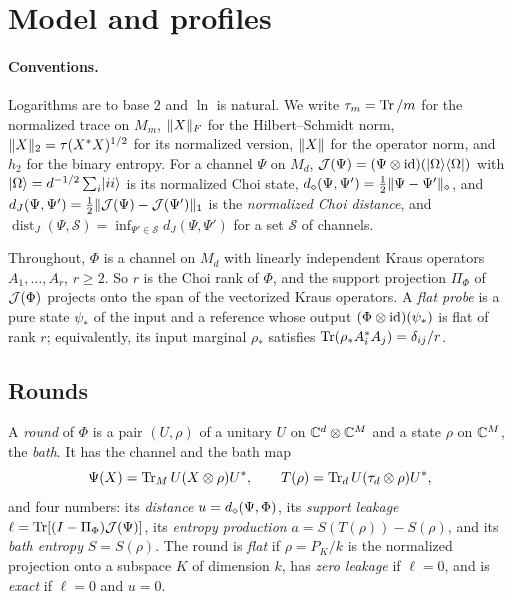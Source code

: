 \section{Model and profiles}\label{sec:model}

\paragraph{Conventions.} Logarithms are to base $2$ and $\ln$ is natural. We write $\tau_m=\operatorname{Tr}/m$ for the normalized trace on $M_m$,
$\lVert X\rVert_F$ for the Hilbert--Schmidt norm, $\lVert X\rVert_2=\tau(X^*X)^{1/2}$ for its normalized version, $\lVert X\rVert$ for the operator norm, and
$h_2$ for the binary entropy. For a channel $\Psi$ on $M_d$, $\mathcal J(\Psi)=(\Psi\otimes\mathrm{id})(\lvert \Omega\rangle\langle \Omega\rvert)$ with
$\lvert \Omega\rangle=d^{-1/2}\sum_i\lvert ii\rangle$ is its normalized Choi state, $d_\diamond(\Psi,\Psi')=\frac12\lVert \Psi-\Psi'\rVert_\diamond$, and
$d_J(\Psi,\Psi')=\frac12\lVert \mathcal J(\Psi)-\mathcal J(\Psi')\rVert_1$ is the \emph{normalized Choi distance}, and
$\operatorname{dist}_J(\Psi,\mathcal S)=\inf_{\Psi'\in\mathcal S}d_J(\Psi,\Psi')$ for a set $\mathcal S$ of channels.

Throughout, $\Phi$ is a channel on $M_d$ with linearly independent Kraus operators $A_1,\dots,A_r$, $r\ge2$. So $r$ is the Choi rank of
$\Phi$, and the support projection $\Pi_\Phi$ of $\mathcal J(\Phi)$ projects onto the span of the vectorized Kraus operators. A \emph{flat probe} is
a pure state $\psi_*$ of the input and a reference whose output $(\Phi\otimes\mathrm{id})(\psi_*)$ is flat of rank $r$; equivalently, its input
marginal $\rho_*$ satisfies $\operatorname{Tr}(\rho_*A_i^*A_j)=\delta_{ij}/r$.

\subsection{Rounds}

\begin{definition}[Rounds]\label{def:round}
A \emph{round} of $\Phi$ is a pair $(U,\rho)$ of a unitary $U$ on $\mathbb C^d\otimes\mathbb C^M$ and a state $\rho$ on $\mathbb C^M$, the \emph{bath}. It has the
channel and the bath map
\[
\Psi(X)=\operatorname{Tr}_M U(X\otimes\rho)U^*,\qquad T(\rho)=\operatorname{Tr}_d U(\tau_d\otimes\rho)U^* ,
\]
and four numbers: its \emph{distance} $u=d_\diamond(\Psi,\Phi)$, its \emph{support leakage} $\ell=\operatorname{Tr}[(I-\Pi_\Phi)\mathcal J(\Psi)]$, its \emph{entropy
production} $a=S(T(\rho))-S(\rho)$, and its \emph{bath entropy} $S=S(\rho)$. The round is \emph{flat} if $\rho=P_K/k$ is the normalized
projection onto a subspace $K$ of dimension $k$, has \emph{zero leakage} if $\ell=0$, and is \emph{exact} if $\ell=0$ and $u=0$.
\end{definition}

